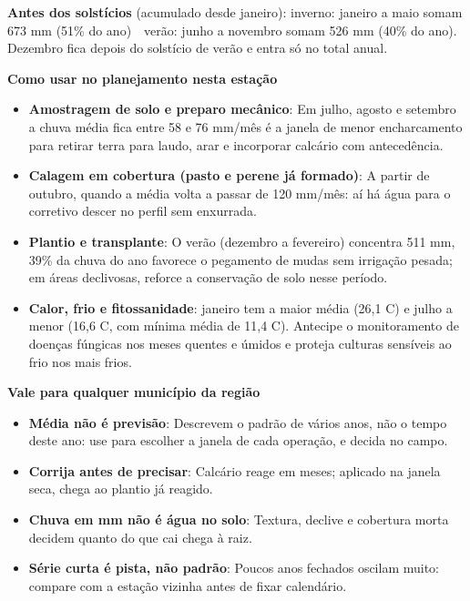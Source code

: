 \documentclass[10pt,a4paper]{article}
\begin{document}
\vspace{1pt}
{\footnotesize\textbf{Antes dos solstícios} (acumulado desde janeiro):
inverno: janeiro a maio somam 673 mm (51\% do ano) \,\textbullet\, verão: junho a novembro somam 526 mm (40\% do ano). Dezembro fica depois do solstício de verão e entra só no total
anual.}

\vspace{2pt}
{\bfseries\small Como usar no planejamento nesta estação}

\footnotesize\begin{itemize}\setlength{\itemsep}{0.5pt}
  \item \textbf{Amostragem de solo e preparo mecânico}: Em julho, agosto e setembro a chuva média fica entre 58 e 76 mm/mês \textemdash{} é a janela de menor encharcamento para retirar terra para laudo, arar e incorporar calcário com antecedência.
  \item \textbf{Calagem em cobertura (pasto e perene já formado)}: A partir de outubro, quando a média volta a passar de 120 mm/mês: aí há água para o corretivo descer no perfil sem enxurrada.
  \item \textbf{Plantio e transplante}: O verão (dezembro a fevereiro) concentra 511 mm, 39\% da chuva do ano \textemdash{} favorece o pegamento de mudas sem irrigação pesada; em áreas declivosas, reforce a conservação de solo nesse período.
  \item \textbf{Calor, frio e fitossanidade}: janeiro tem a maior média (26,1 \textdegree{}C) e julho a menor (16,6 \textdegree{}C, com mínima média de 11,4 \textdegree{}C). Antecipe o monitoramento de doenças fúngicas nos meses quentes e úmidos e proteja culturas sensíveis ao frio nos mais frios.
\end{itemize}

\vspace{1pt}
{\bfseries\small Vale para qualquer município da região}

\scriptsize\begin{itemize}\setlength{\itemsep}{0.5pt}
  \item \textbf{Média não é previsão}: Descrevem o padrão de vários anos, não o tempo deste ano: use para escolher a janela de cada operação, e decida no campo.
  \item \textbf{Corrija antes de precisar}: Calcário reage em meses; aplicado na janela seca, chega ao plantio já reagido.
  \item \textbf{Chuva em mm não é água no solo}: Textura, declive e cobertura morta decidem quanto do que cai chega à raiz.
  \item \textbf{Série curta é pista, não padrão}: Poucos anos fechados oscilam muito: compare com a estação vizinha antes de fixar calendário.
\end{itemize}
\end{document}

